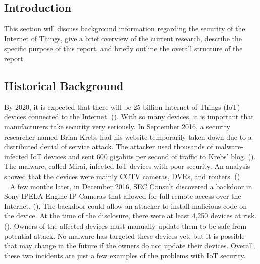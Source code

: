\documentclass[letterpaper, 12pt]{article}
\begin{document}
\begin{flushleft}
\section*{Introduction}
This section will discuss background information regarding the security of the Internet of Things, give a brief overview of the current research,
describe the specific purpose of this report, and briefly outline the overall structure of the report.

\subsection*{Historical Background}
By 2020, it is expected that there will be 
25 billion Internet of Things (IoT) devices connected to the Internet. (\cite{Martinez1}). With so many devices, it is important that manufacturers take security very seriously. 
In September 2016, a security researcher named Brian Krebs had his website temporarily taken down due to a distributed denial of service attack. The attacker
used thousands of malware-infected IoT devices and sent 600 gigabits per second of traffic to Krebs' blog. (\cite{Krebs}). The malware, called Mirai, 
infected IoT devices with poor security. An analysis showed that the devices were mainly CCTV cameras, DVRs, and routers. (\cite{Incapsula}).\\
~\newline
A few months later, in December 2016, SEC Consult discovered a backdoor in Sony IPELA Engine IP Cameras that allowed for full remote access over the Internet. (\cite{sec}). The backdoor could allow an attacker
to install malicious code on the device. At the time of the disclosure, there were at least 4,250 devices at risk. (\cite{Krebs2}). Owners of the affected devices must manually update them
to be safe from potential attack. No malware has targeted these devices yet, but it is possible that may change in the future if the owners do not update their devices. Overall, these two incidents
are just a few examples of the problems with IoT security.


\end{flushleft}
\end{document}
